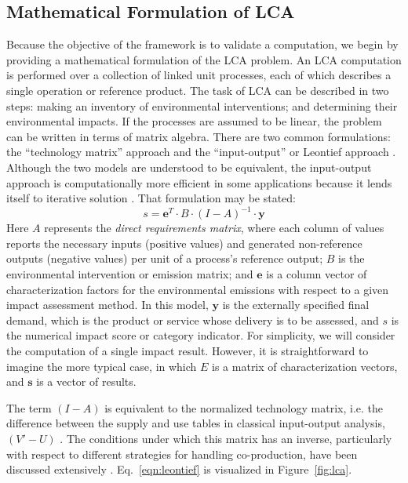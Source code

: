 \subsection{Mathematical Formulation of LCA}

Because the objective of the framework is to validate a computation, we begin by providing a mathematical formulation of the LCA problem.  An LCA computation is performed over a collection of linked unit processes, each of which describes a single operation or reference product.  The task of LCA can be described in two steps: making an inventory of environmental interventions; and determining their environmental impacts.  If the processes are assumed to be linear, the problem can be written in terms of matrix algebra.  There are two common formulations: the ``technology matrix'' approach and the ``input-output'' or Leontief approach \citep{Heijungs2002, Pauliuk_2015_framework}.  Although the two models are understood to be equivalent, the input-output approach is computationally more efficient in some applications because it lends itself to iterative solution \citep{Peters_JLCA_2007}.  That formulation may be stated:
\begin{equation}
s = \mathbf{e}^T \cdot B \cdot \left(I - A\right)^{-1} \cdot \mathbf{y}
\label{eqn:leontief}
\end{equation}
Here $A$ represents the \emph{direct requirements matrix}, where each column of values reports the necessary inputs (positive values) and generated non-reference outputs (negative values) per unit of a process's reference output; $B$ is the environmental intervention or emission matrix; and $\mathbf{e}$ is a column vector of characterization factors for the environmental emissions with respect to a given impact assessment method.  In this model, $\mathbf{y}$ is the externally specified final demand, which is the product or service whose delivery is to be assessed, and $s$ is the numerical impact score or category indicator.  For simplicity, we will consider the computation of a single impact result.  However, it is straightforward to imagine the more typical case, in which $E$ is a matrix of characterization vectors, and $\mathbf{s}$ is a vector of results.

The term $(I-A)$ is equivalent to the normalized technology matrix, i.e. the difference between the supply and use tables in classical input-output analysis, $(V'-U)$ \citep{Suh_JIE_2010}.  The conditions under which this matrix has an inverse, particularly with respect to different strategies for handling co-production, have been discussed extensively \citep{Majeau_Bettez_2014}.  Eq.~\ref{eqn:leontief} is visualized in Figure~\ref{fig:lca}. 


